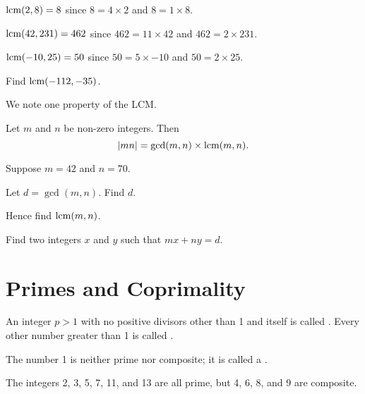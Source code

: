\begin{example}
    $\mathrm{lcm}(2, 8) = 8$ since $8 = 4 \times 2$ and $8 = 1 \times 8$.
\end{example}

\begin{example}
    $\mathrm{lcm}(42, 231) = 462$ since $462 = 11 \times 42$ and $462 = 2 \times 231$.
\end{example}

\begin{example}
    $\mathrm{lcm}(-10, 25) = 50$ since $50 = 5 \times -10$ and $50 = 2 \times 25$.
\end{example}

\begin{exercise}
    Find $\mathrm{lcm}(-112, -35)$.
\end{exercise}

We note one property of the LCM.
\begin{proposition}\label{prop-product-of-gcd-and-lcm}
    Let $m$ and $n$ be non-zero integers. Then
    \[
        |mn| = \gcd(m,n) \times \mathrm{lcm}(m,n).
    \]
\end{proposition}

\begin{exercise}
    Suppose $m = 42$ and $n = 70$.
    \begin{partquestions}{\roman*}
        \item Let $d = \gcd(m,n)$. Find $d$.
        \item Hence find $\mathrm{lcm}(m,n)$.
        \item Find two integers $x$ and $y$ such that $mx + ny = d$.
    \end{partquestions}
\end{exercise}

\section{Primes and Coprimality}
\begin{definition}\label{definition-prime-number}
    An integer $p > 1$ with no positive divisors other than 1 and itself is called . Every other number greater than 1 is called .
\end{definition}
\begin{remark}
    The number 1 is neither prime nor composite; it is called a .
\end{remark}

\begin{example}
    The integers 2, 3, 5, 7, 11, and 13 are all prime, but 4, 6, 8, and 9 are composite.
\end{example}

